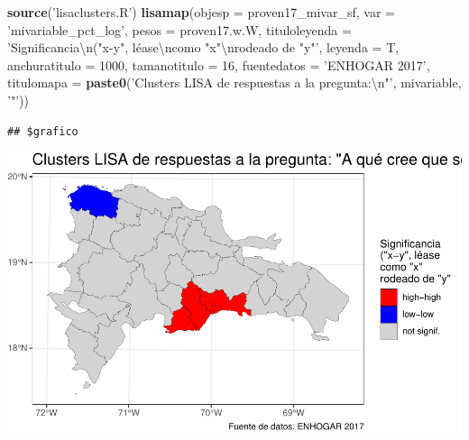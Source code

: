 \documentclass[11pt,]{article}
\newenvironment{Shaded}{\begin{snugshade}}{\end{snugshade}}
\newcommand{\KeywordTok}[1]{\textcolor[rgb]{0.13,0.29,0.53}{\textbf{#1}}}
\newcommand{\DataTypeTok}[1]{\textcolor[rgb]{0.13,0.29,0.53}{#1}}
\newcommand{\DecValTok}[1]{\textcolor[rgb]{0.00,0.00,0.81}{#1}}
\newcommand{\CharTok}[1]{\textcolor[rgb]{0.31,0.60,0.02}{#1}}
\newcommand{\StringTok}[1]{\textcolor[rgb]{0.31,0.60,0.02}{#1}}
\newcommand{\NormalTok}[1]{#1}
\begin{document}
\begin{Shaded}
\begin{Highlighting}[]
\KeywordTok{source}\NormalTok{(}\StringTok{'lisaclusters.R'}\NormalTok{)}
\KeywordTok{lisamap}\NormalTok{(}\DataTypeTok{objesp =}\NormalTok{ proven17_mivar_sf,}
        \DataTypeTok{var =} \StringTok{'mivariable_pct_log'}\NormalTok{,}
        \DataTypeTok{pesos =}\NormalTok{ proven17.w.W,}
        \DataTypeTok{tituloleyenda =} \StringTok{'Significancia}\CharTok{\textbackslash{}n}\StringTok{("x-y", léase}\CharTok{\textbackslash{}n}\StringTok{como "x"}\CharTok{\textbackslash{}n}\StringTok{rodeado de "y"'}\NormalTok{,}
        \DataTypeTok{leyenda =}\NormalTok{ T,}
        \DataTypeTok{anchuratitulo =} \DecValTok{1000}\NormalTok{,}
        \DataTypeTok{tamanotitulo =} \DecValTok{16}\NormalTok{,}
        \DataTypeTok{fuentedatos =} \StringTok{'ENHOGAR 2017'}\NormalTok{,}
        \DataTypeTok{titulomapa =} \KeywordTok{paste0}\NormalTok{(}\StringTok{'Clusters LISA de respuestas a la pregunta:}\CharTok{\textbackslash{}n}\StringTok{"'}\NormalTok{, mivariable, }\StringTok{'"'}\NormalTok{))}
\end{Highlighting}
\end{Shaded}

\begin{verbatim}
## $grafico
\end{verbatim}

\includegraphics{proyecto_files/figure-latex/unnamed-chunk-25-2.pdf}
\end{document}
